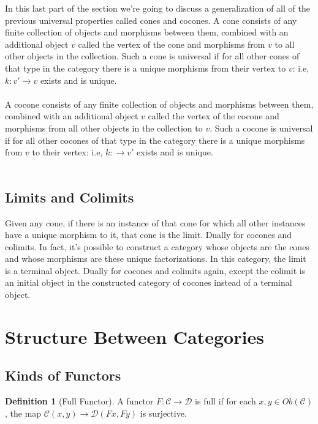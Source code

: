 \documentclass{article}
\theoremstyle{definition}
\newtheorem{definition}{Definition}
\begin{document}
In this last part of the section we're going to discuss a generalization of all of the previous universal properties called cones and cocones.
A cone consists of any finite collection of objects and morphisms between them, combined with an additional object $v$ called the vertex of the cone and morphisms from $v$ to all other objects in the collection.
Such a cone is universal if for all other cones of that type in the category there is a unique morphisms from their vertex to $v$: i.e, $k:v'\rightarrow v$ exists and is unique.\\\\

A cocone consists of any finite collection of objects and morphisms between them, combined with an additional object $v$ called the vertex of the cocone and morphisms from all other objects in the collection to $v$.
Such a cocone is universal if for all other cocones of that type in the category there is a unique morphisms from $v$ to their vertex: i.e, $k:\rightarrow v'$ exists and is unique.\\\\

\subsection*{Limits and Colimits}
Given any cone, if there is an instance of that cone for which all other instances have a unique morphism to it, that cone is the limit.
Dually for cocones and colimits.
In fact, it's possible to construct a category whose objects are the cones and whose morphisms are these unique factorizations.
In this category, the limit is a terminal object.
Dually for cocones and colimits again, except the colimit is an initial object in the constructed category of cocones instead of a terminal object.


\section*{Structure Between Categories}

\subsection*{Kinds of Functors}

\begin{definition}[Full Functor]
    A functor $F:\mathcal{C}\rightarrow\mathcal{D}$ is full if for each $x,y\in Ob(\mathcal{C})$, the map $\mathcal{C}(x, y)\rightarrow\mathcal{D}(Fx,Fy)$ is surjective.
\end{definition}
\end{document}
